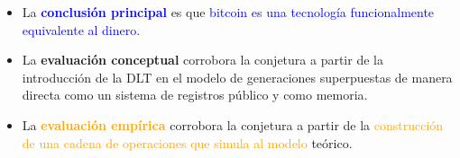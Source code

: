 \begin{frame}{}

    \vspace{5mm}
    \begin{itemize}
        \setlength\itemsep{1em}
        \item[] La \textcolor{blue}{\textbf{conclusión principal}} es que \textcolor{blue}{bitcoin es una tecnología funcionalmente equivalente al dinero}.  
        \item[] La \textcolor{dgreen}{\textbf{evaluación conceptual}} corrobora la conjetura a partir de la introducción de la DLT en el modelo de generaciones superpuestas de manera directa como un \textcolor{dgreen}{sistema de registros público} y como \textcolor{dgreen}{memoria}.
        \item[] La \textcolor{orange}{\textbf{evaluación empírica}} corrobora la conjetura a partir de la \textcolor{orange}{construcción de una cadena de operaciones que simula al modelo} teórico.
    \end{itemize}

    
\end{frame}
